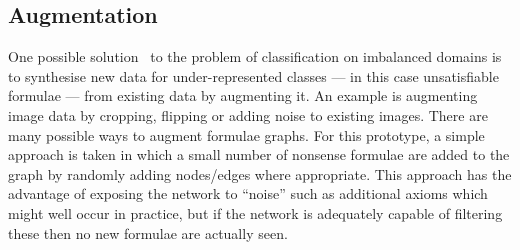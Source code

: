 \documentclass[runningheads]{llncs}
\begin{document}
\subsection{Augmentation}
\label{section:augmentation}
One possible solution~\cite{imbalanced} to the problem of classification on imbalanced domains is to synthesise new data for under-represented classes --- in this case unsatisfiable formulae --- from existing data by augmenting it.
An example is augmenting image data by cropping, flipping or adding noise to existing images.
There are many possible ways to augment formulae graphs.
For this prototype, a simple approach is taken in which a small number of nonsense formulae are added to the graph by randomly adding nodes/edges where appropriate.
This approach has the advantage of exposing the network to ``noise'' such as additional axioms which might well occur in practice, but if the network is adequately capable of filtering these then no new formulae are actually seen.
\end{document}
